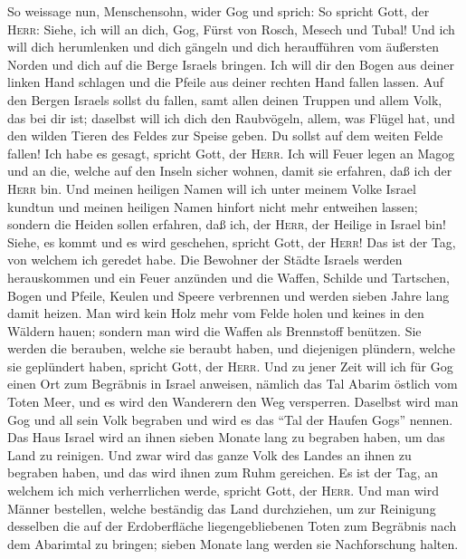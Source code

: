  So weissage nun, Menschensohn, wider Gog und sprich: So
spricht Gott, der \textsc{Herr}: Siehe, ich will an dich, Gog, Fürst von
Rosch, Mesech und Tubal!  Und ich will dich herumlenken
und dich gängeln und dich heraufführen vom äußersten Norden und dich auf
die Berge Israels bringen.  Ich will dir den Bogen aus
deiner linken Hand schlagen und die Pfeile aus deiner rechten Hand
fallen lassen.  Auf den Bergen Israels sollst du fallen,
samt allen deinen Truppen und allem Volk, das bei dir ist; daselbst will
ich dich den Raubvögeln, allem, was Flügel hat, und den wilden Tieren
des Feldes zur Speise geben.  Du sollst auf dem weiten
Felde fallen! Ich habe es gesagt, spricht Gott, der \textsc{Herr}.
 Ich will Feuer legen an Magog und an die, welche auf den
Inseln sicher wohnen, damit sie erfahren, daß ich der \textsc{Herr} bin.
 Und meinen heiligen Namen will ich unter meinem Volke
Israel kundtun und meinen heiligen Namen hinfort nicht mehr entweihen
lassen; sondern die Heiden sollen erfahren, daß ich, der \textsc{Herr},
der Heilige in Israel bin!  Siehe, es kommt und es wird
geschehen, spricht Gott, der \textsc{Herr}! Das ist der Tag, von welchem
ich geredet habe.  Die Bewohner der Städte Israels werden
herauskommen und ein Feuer anzünden und die Waffen, Schilde und
Tartschen, Bogen und Pfeile, Keulen und Speere verbrennen und werden
sieben Jahre lang damit heizen.  Man wird kein Holz mehr
vom Felde holen und keines in den Wäldern hauen; sondern man wird die
Waffen als Brennstoff benützen. Sie werden die berauben, welche sie
beraubt haben, und diejenigen plündern, welche sie geplündert haben,
spricht Gott, der \textsc{Herr}.  Und zu jener Zeit will
ich für Gog einen Ort zum Begräbnis in Israel anweisen, nämlich das Tal
Abarim östlich vom Toten Meer, und es wird den Wanderern den Weg
versperren. Daselbst wird man Gog und all sein Volk begraben und wird es
das ``Tal der Haufen Gogs'' nennen.  Das Haus Israel wird
an ihnen sieben Monate lang zu begraben haben, um das Land zu reinigen.
 Und zwar wird das ganze Volk des Landes an ihnen zu
begraben haben, und das wird ihnen zum Ruhm gereichen. Es ist der Tag,
an welchem ich mich verherrlichen werde, spricht Gott, der
\textsc{Herr}.  Und man wird Männer bestellen, welche
beständig das Land durchziehen, um zur Reinigung desselben die auf der
Erdoberfläche liegengebliebenen Toten zum Begräbnis nach dem Abarimtal
zu bringen; sieben Monate lang werden sie Nachforschung halten.
